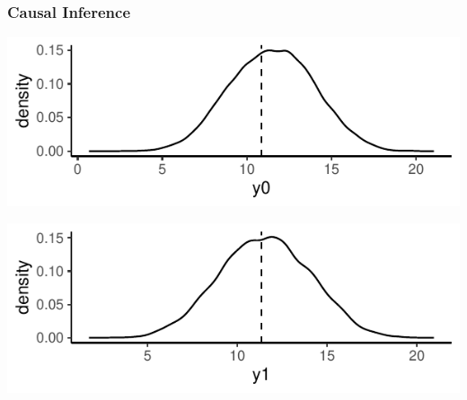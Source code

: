 \documentclass[xcolor=x11names,compress]{beamer}\usepackage[]{graphicx}\usepackage[]{color}
\makeatletter
\def\maxwidth{ %
  \ifdim\Gin@nat@width>\linewidth
    \linewidth
  \else
    \Gin@nat@width
  \fi
}
\newenvironment{knitrout}{}{} %
\renewcommand{\(}{\begin{columns}}
\renewcommand{\)}{\end{columns}}
\newcommand{\<}[1]{\begin{column}{#1}}
\renewcommand{\>}{\end{column}}
\makeatother
\begin{document}
\begin{frame}
\frametitle{Causal Inference}
\begin{knitrout}
\color{fgcolor}
\includegraphics[width=\maxwidth]{figure/OVB1a-1} 

\end{knitrout}
\pause
\begin{knitrout}
\color{fgcolor}
\includegraphics[width=\maxwidth]{figure/OVB2a-1} 

\end{knitrout}
\end{frame}
\end{document}
